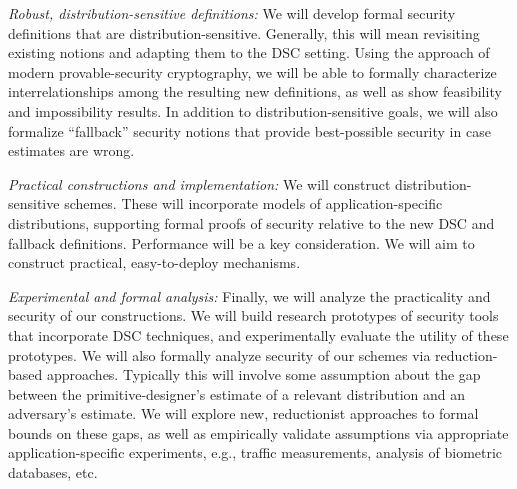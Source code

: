 {{\begin{newenum}
\item{\em Robust, distribution-sensitive definitions:} 
We will develop formal security definitions that are
distribution-sensitive. Generally, this will mean revisiting existing notions
and adapting them to the DSC setting. Using the approach of modern 
provable-security cryptography, we will be able to formally characterize interrelationships among the resulting new
definitions, as well as show feasibility and impossibility results. 
In addition to distribution-sensitive goals, we will also formalize
``fallback'' security notions that provide best-possible security in case estimates are wrong.

\item{\em Practical constructions and implementation:}  
We will construct distribution-sensitive schemes. These will incorporate
models of application-specific distributions, supporting formal
proofs of security relative to the new DSC and fallback definitions. Performance will be a key consideration. We will
aim to construct practical, easy-to-deploy mechanisms.

\item{\em Experimental and formal analysis:} Finally, we will analyze the
practicality and security of our constructions. We will build
research prototypes of security tools that incorporate DSC techniques, and
experimentally evaluate the utility of these prototypes.  We will also formally analyze security of
our schemes via reduction-based approaches. Typically this will involve some
assumption about the gap between the primitive-designer's estimate of a
relevant distribution and an adversary's estimate. We will explore new,
reductionist approaches to formal bounds on these gaps, as well as
empirically validate assumptions via appropriate application-specific
experiments, e.g., traffic measurements, analysis of biometric databases, etc. 
\end{newenum}

}}
